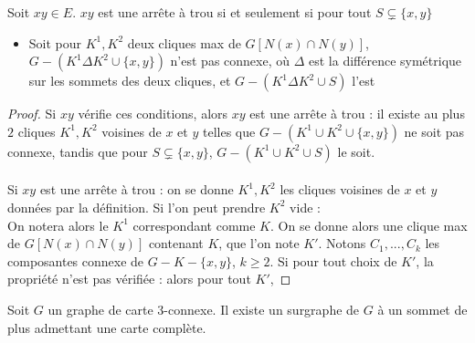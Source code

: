 \documentclass{scrartcl}
\begin{document}
\begin{flushleft}
\begin{prop}
    Soit $xy \in E$. $xy$ est une arrête à trou si et seulement si pour tout $S \subsetneq \{x, y\}$
    \begin{itemize}
        \item Soit pour $K^1, K^2$ deux cliques max de $G[N(x) \cap N(y)]$, $G - (K^1 \Delta K^2 \cup \{x,y\})$ n'est pas connexe,
        où $\Delta$ est la différence symétrique sur les sommets des deux cliques, et $G - (K^1 \Delta K^2 \cup S)$ l'est
    \end{itemize} 
    
\end{prop}

\begin{proof}
    Si $xy$ vérifie ces conditions, alors $xy$ est une arrête à trou : il existe au plus $2$ cliques $K^1, K^2$ voisines de $x$ et $y$
    telles que $G - (K^1 \cup K^2 \cup \{x,y\})$ ne soit pas connexe, tandis que pour $S \subsetneq \{x,y\}$, $G - (K^1 \cup K^2 \cup S)$
    le soit.
    \\~\\
    Si $xy$ est une arrête à trou : on se donne $K^1, K^2$ les cliques voisines de $x$ et $y$ données par la définition.
    Si l'on peut prendre $K^2$ vide :\\
    On notera alors le $K^1$ correspondant comme $K$. On se donne alors une clique max de $G[N(x) \cap N(y)]$ contenant $K$, que l'on note $K'$.
    Notons $C_1, ..., C_k$ les composantes connexe de $G - K - \{x,y\}$, $k \geq 2$. Si pour tout choix de $K'$, la propriété n'est pas
    vérifiée : alors pour tout $K'$, 
\end{proof}

\begin{lem}\label{3connCompl}
    Soit $G$ un graphe de carte $3$-connexe. Il existe un surgraphe de $G$ à un sommet de plus admettant une carte complète.
\end{lem}


\end{flushleft}
\end{document}
